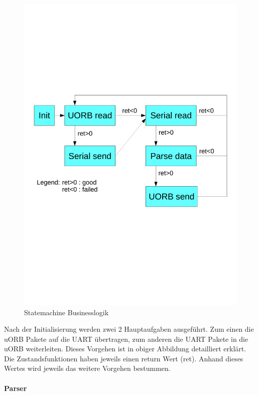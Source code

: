 \begin{figure}[ht]
  \begin{center}
  \includegraphics[scale=0.5, trim={1cm 9.5cm 0cm 9cm},clip]{pic/50_app/statemachine_thread.pdf}
  \caption{Statemachine Businesslogik}
  \label{fig:Statemachine Businesslogik}
  \end{center}
\end{figure}

\noindent Nach der Initialisierung werden zwei 2 Hauptaufgaben ausgeführt. Zum einen die uORB Pakete auf die UART übertragen, zum anderen die UART Pakete in die uORB weiterleiten. Dieses Vorgehen ist in obiger Abbildung detailliert erklärt. Die Zustandsfunktionen haben jeweils einen return Wert (ret). Anhand dieses Wertes wird jeweils das weitere Vorgehen bestummen.

\clearpage
\paragraph{Parser}\mbox{}\\

